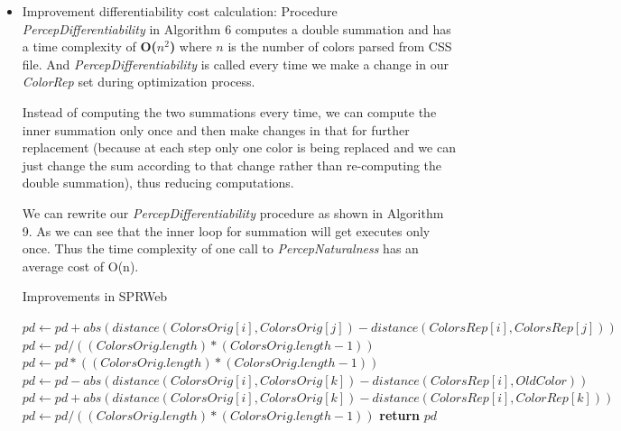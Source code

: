 \begin{itemize}
\item {Improvement differentiability cost calculation:}  Procedure \textit{PercepDifferentiability} in Algorithm 6 computes a double summation and has a time complexity of \textbf{O($n^{2}$)} where $n$ is the number of colors parsed from CSS file. And \textit{PercepDifferentiability} is called every time we make a change in our \textit{ColorRep} set during optimization process.


Instead of computing the two summations every time, we can compute the inner summation only once and then make changes in that for further replacement (because at each step only one color is being replaced and we can just change the sum according to that change rather than re-computing the double summation), thus reducing computations.

We can rewrite our \textit{PercepDifferentiability} procedure as shown in Algorithm 9. As we can see that the inner  loop for summation will get executes only once. Thus the time complexity of one call to \textit{PercepNaturalness} has an average cost of
O(n).


\begin{algorithm}[!htb]
\caption{Improvements in SPRWeb}\label{Improvements differentiability}
\begin{algorithmic}[1]
 
  
				\State $pd \gets pd + abs(distance(ColorsOrig[i],ColorsOrig[j]) - distance(ColorsRep[i],ColorsRep[j]))$
			\EndFor
		\EndFor
		\State $pd \gets pd/((ColorsOrig.length)*(ColorsOrig.length-1))$
\Else 
\State $pd \gets pd*((ColorsOrig.length)*(ColorsOrig.length-1))$
	\State $pd  \gets pd - abs(distance(ColorsOrig[i],ColorsOrig[k]) - distance(ColorsRep[i],OldColor))$
	\State $pd  \gets pd + abs(distance(ColorsOrig[i],ColorsOrig[k]) - distance(ColorsRep[i],ColorRep[k]))$
\EndFor
\State $pd \gets pd/((ColorsOrig.length)*(ColorsOrig.length-1))$
\EndIf
\State \textbf{return} $pd$
\EndProcedure
\end{algorithmic}
\end{algorithm}


\end{itemize}

